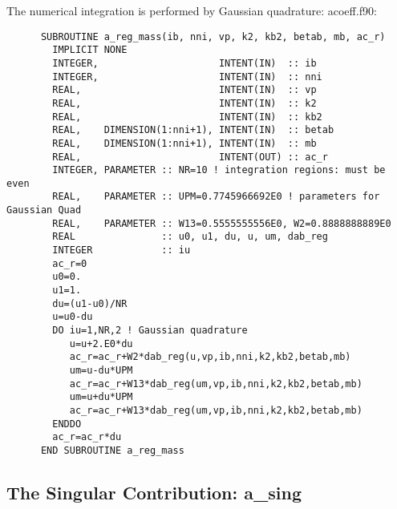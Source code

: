 \documentclass[preprint,12pt,eqsecnum,nofootinbib,amsmath,amssymb]{revtex4}
\begin{document}
{{\noindent
The numerical integration is performed by Gaussian quadrature:
\vskip0.4cm
\noindent
acoeff.f90:
{
\baselineskip 10pt
\begin{verbatim}
      SUBROUTINE a_reg_mass(ib, nni, vp, k2, kb2, betab, mb, ac_r)
        IMPLICIT NONE
        INTEGER,                     INTENT(IN)  :: ib
        INTEGER,                     INTENT(IN)  :: nni 
        REAL,                        INTENT(IN)  :: vp
        REAL,                        INTENT(IN)  :: k2
        REAL,                        INTENT(IN)  :: kb2
        REAL,    DIMENSION(1:nni+1), INTENT(IN)  :: betab
        REAL,    DIMENSION(1:nni+1), INTENT(IN)  :: mb
        REAL,                        INTENT(OUT) :: ac_r
        INTEGER, PARAMETER :: NR=10 ! integration regions: must be even
        REAL,    PARAMETER :: UPM=0.7745966692E0 ! parameters for Gaussian Quad
        REAL,    PARAMETER :: W13=0.5555555556E0, W2=0.8888888889E0
        REAL               :: u0, u1, du, u, um, dab_reg
        INTEGER            :: iu
        ac_r=0
        u0=0.
        u1=1.
        du=(u1-u0)/NR
        u=u0-du
        DO iu=1,NR,2 ! Gaussian quadrature
           u=u+2.E0*du
           ac_r=ac_r+W2*dab_reg(u,vp,ib,nni,k2,kb2,betab,mb)
           um=u-du*UPM
           ac_r=ac_r+W13*dab_reg(um,vp,ib,nni,k2,kb2,betab,mb)
           um=u+du*UPM
           ac_r=ac_r+W13*dab_reg(um,vp,ib,nni,k2,kb2,betab,mb)
        ENDDO
        ac_r=ac_r*du
      END SUBROUTINE a_reg_mass
\end{verbatim}
}



\subsection{The Singular Contribution: a\_sing}

}}
\end{document}

